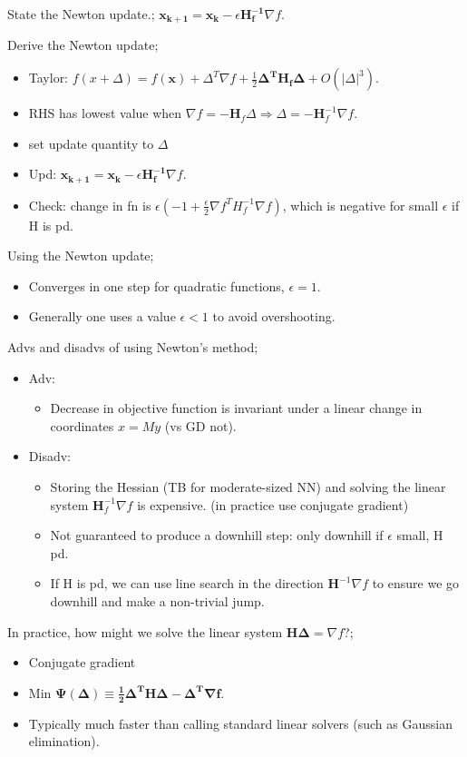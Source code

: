 \documentclass{article}
\begin{document}
State the Newton update.; $\mathbf{x_{k+1} = x_k} - \epsilon\mathbf{H^{-1}_f}\nabla f$.

Derive the Newton update; \begin{itemize} \item Taylor: $f(x+\Delta) = f(\mathbf{x}) + \Delta^T\nabla f + \frac{1}{2}\mathbf{\Delta^T H_f \Delta} + O(|\Delta|^3)$.  \item RHS has lowest value when $\nabla f = -\mathbf{H}_f\Delta \Rightarrow \Delta = -\mathbf{H}^{-1}_f \nabla f$.  \item set update quantity to $\Delta$ \item Upd: $\mathbf{x_{k+1} = x_k} - \epsilon\mathbf{H^{-1}_f}\nabla f$.  \item Check: change in fn is $\epsilon (-1+\frac{\epsilon}{2}\nabla f^T H^{-1}_f\nabla f)$, which is negative for small $\epsilon$ if H is pd.\end{itemize}

Using the Newton update; \begin{itemize} \item Converges in one step for quadratic functions, $\epsilon = 1$.  \item Generally one uses a value $\epsilon < 1$ to avoid overshooting.  \end{itemize}

Advs and disadvs of using Newton's method; \begin{itemize} \item Adv: \begin{itemize} \item Decrease in objective function is invariant under a linear change in coordinates $x=My$ (vs GD not).  \end{itemize} \item Disadv: \begin{itemize} \item Storing the Hessian (TB for moderate-sized NN) and solving the linear system $\mathbf{H}_f^{-1}\nabla f$ is expensive. (in practice use conjugate gradient) \item Not guaranteed to produce a downhill step: only downhill if $\epsilon$ small, H pd.  \item If H is pd, we can use line search in the direction $\mathbf{H}^{-1}\nabla f$ to ensure we go downhill and make a non-trivial jump.  \end{itemize} \end{itemize}

In practice, how might we solve the linear system $\mathbf{H\Delta}=\nabla f$?; \begin{itemize} \item Conjugate gradient \item Min $\mathbf{\Psi(\Delta)\equiv \frac{1}{2}\Delta^TH\Delta -\Delta^T\nabla f}$.  \item Typically much faster than calling standard linear solvers (such as Gaussian elimination).  \end{itemize}
\end{document}
